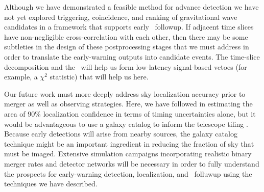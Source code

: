 Although we have demonstrated a feasible method for advance detection we have
not yet explored triggering, coincidence, and ranking of gravitational wave
candidates in a framework that supports early \EM\ followup.  If adjacent time slices
have non-negligible cross-correlation with each other, then there may be some
subtleties in the design of these postprocessing stages that we must address in order
to translate the early-warning outputs into candidate events.  The time-slice
decomposition and the \SVD\ will help us form low-latency signal-based vetoes
(for example, a $\chi^2$ statistic) that will help us here.

Our future work must more deeply address sky localization accuracy prior to
merger as well as observing strategies. Here, we have followed
\citet{Fairhurst2009} in estimating the area of 90\% localization confidence in
terms of timing uncertainties alone, but it would be advantageous to use a
galaxy catalog to inform the telescope tiling \citep{galaxy-catalog}. Because
early detections will arise from nearby sources, the galaxy catalog technique
might be an important ingredient in reducing the fraction of sky that must be
imaged.  Extensive simulation campaigns incorporating realistic binary merger
rates and detector networks will be necessary in order to fully understand the
prospects for early-warning detection, localization, and \EM\ folluwup using
the techniques we have described.



